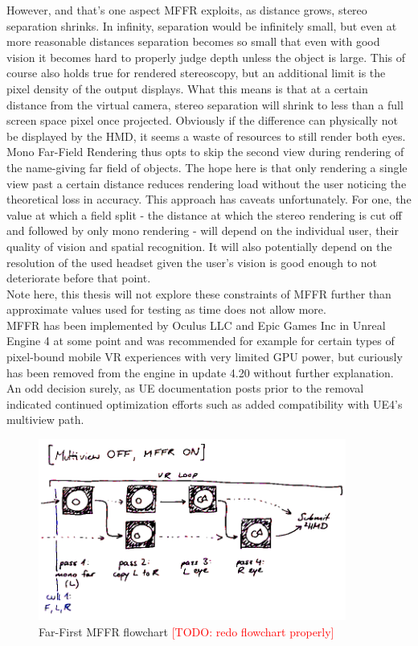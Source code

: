 However, and that's one aspect MFFR exploits, as distance grows, stereo separation shrinks. In infinity, separation would be infinitely small, but even at more reasonable distances separation becomes so small that even with good vision it becomes hard to properly judge depth unless the object is large. This of course also holds true for rendered stereoscopy, but an additional limit is the pixel density of the output displays. What this means is that at a certain distance from the virtual camera, stereo separation will shrink to less than a full screen space pixel once projected. Obviously if the difference can physically not be displayed by the HMD, it seems a waste of resources to still render both eyes. \\
Mono Far-Field Rendering thus opts to skip the second view during rendering of the name-giving far field of objects. The hope here is that only rendering a single view past a certain distance reduces rendering load without the user noticing the theoretical loss in accuracy. 
This approach has caveats unfortunately. For one, the value at which a field split - the distance at which the stereo rendering is cut off and followed by only mono rendering - will depend on the individual user, their quality of vision and spatial recognition. It will also potentially depend on the resolution of the used headset given the user's vision is good enough to not deteriorate before that point. \\
Note here, this thesis will not explore these constraints of MFFR further than approximate values used for testing as time does not allow more. \\
MFFR has been implemented by Oculus LLC and Epic Games Inc in Unreal Engine 4 at some point and was recommended for example for certain types of pixel-bound mobile VR experiences with very limited GPU power, but curiously has been removed from the engine in update 4.20 without further explanation. An odd decision surely, as UE documentation posts prior to the removal indicated continued optimization efforts such as added compatibility with UE4's multiview path\cite{EpicGamesInc..2016}. 

\begin{figure}[htb]
  \centering
  \includegraphics[width=0.9\textwidth]{pictures/flowchart_mffr}
  \caption{Far-First MFFR flowchart \textcolor{red}{[TODO: redo flowchart properly]}} \label{fig:flowchart_mffr_FarFirst}
\end{figure}

